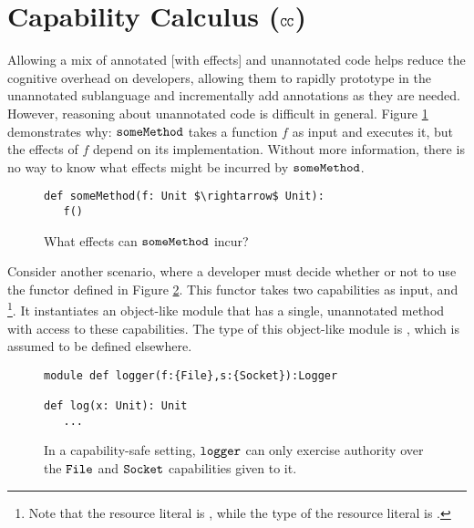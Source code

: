 \vspace{-0.3cm}
\section{Capability Calculus ($\mathtt{CC}$)}
\vspace{-0.3cm}
\label{s:cc}

Allowing a mix of annotated [with effects] and unannotated code helps
reduce the cognitive overhead on developers, allowing them to rapidly
prototype in the unannotated sublanguage and incrementally add
annotations as they are needed. However, reasoning about unannotated
code is difficult in general. Figure \ref{fig:unannotated_reasoning}
demonstrates why: $\mathtt{someMethod}$ takes a function $f$ as input and
executes it, but the effects of $f$ depend on its
implementation. Without more information, there is no way to know what
effects might be incurred by $\mathtt{someMethod}$.

\begin{figure}
\vspace{-0.8cm}
\begin{lstlisting}
def someMethod(f: Unit $\rightarrow$ Unit):
   f()
\end{lstlisting}
\vspace{-0.5cm}
\caption{What effects can $\mathtt{someMethod}$ incur?}
\vspace{-0.5cm}
\label{fig:unannotated_reasoning}
\end{figure}

Consider another scenario, where a developer must decide whether or not
to use the  functor defined in Figure \ref{fig:cc_motivation}. This
functor takes two capabilities as input,  and \footnote{Note that the resource literal is , while the type of the resource literal is
.}. It instantiates an object-like module that has a single, unannotated  method with access to these capabilities. The type of this object-like module is , which is assumed to be defined elsewhere.

\begin{figure}
\begin{lstlisting}
module def logger(f:{File},s:{Socket}):Logger

def log(x: Unit): Unit
   ...
\end{lstlisting}
\vspace{-0.5cm}
\caption{In a capability-safe setting, $\mathtt{logger}$ can only exercise authority over the $\mathtt{File}$ and $\mathtt{Socket}$ capabilities given to it.}
\vspace{-0.5cm}
\label{fig:cc_motivation}
\end{figure}

